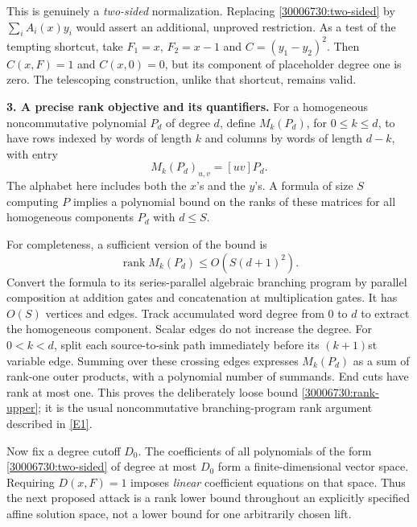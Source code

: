 \documentclass[11pt,a4paper]{article}
\newcommand{\eref}[2]{\hyperlink{extra:#1:#2}{[E#2]}}
\numberwithin{equation}{section}
\begin{document}
This is genuinely a \emph{two-sided} normalization. Replacing
\eqref{30006730:two-sided} by $\sum_i A_i(x)y_i$ would assert an additional,
unproved restriction. As a test of the tempting shortcut, take
$F_1=x$, $F_2=x-1$ and $C=(y_1-y_2)^2$. Then $C(x,F)=1$ and $C(x,0)=0$,
but its component of placeholder degree one is zero. The telescoping
construction, unlike that shortcut, remains valid.

\medskip
\textbf{3. A precise rank objective and its quantifiers.}
For a homogeneous noncommutative polynomial $P_d$ of degree $d$, define
$M_k(P_d)$, for $0\leq k\leq d$, to have rows indexed by words of length $k$
and columns by words of length $d-k$, with entry
\[
 M_k(P_d)_{u,v}=[uv]P_d.
\]
The alphabet here includes both the $x$'s and the $y$'s. A formula of size $S$
computing $P$ implies a polynomial bound on the ranks of these matrices for
all homogeneous components $P_d$ with $d\leq S$.

For completeness, a sufficient version of the bound is
\begin{equation}\label{30006730:rank-upper}
 \operatorname{rank}M_k(P_d)\leq O(S(d+1)^2).
\end{equation}
Convert the formula to its series-parallel algebraic branching program by
parallel composition at addition gates and concatenation at multiplication
gates. It has $O(S)$ vertices and edges. Track accumulated word degree from
$0$ to $d$ to extract the homogeneous component. Scalar edges do not increase
the degree. For $0<k<d$, split each source-to-sink path immediately before its
$(k+1)$st variable edge. Summing over these crossing edges expresses
$M_k(P_d)$ as a sum of rank-one outer products, with a polynomial number of
summands. End cuts have rank at most one. This proves the deliberately loose
bound \eqref{30006730:rank-upper}; it is the usual noncommutative
branching-program rank argument described in \eref{30006730}{1}.

Now fix a degree cutoff $D_0$. The coefficients of all polynomials of the form
\eqref{30006730:two-sided} of degree at most $D_0$ form a finite-dimensional vector
space. Requiring $D(x,F)=1$ imposes \emph{linear} coefficient equations on
that space. Thus the next proposed attack is a rank lower bound throughout
an explicitly specified affine solution space, not a lower bound for one
arbitrarily chosen lift.
\end{document}
